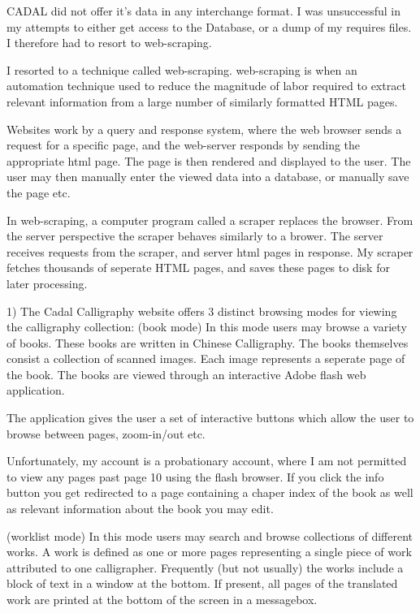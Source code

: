             CADAL did not offer it's data in any interchange format.  I was unsuccessful in my attempts to either get access to the Database, or a dump of my requires files.  I therefore had to resort to web-scraping.
            
              I resorted to a technique called web-scraping.  web-scraping is when an automation technique used to reduce the magnitude of labor required to extract relevant information from a large number of similarly formatted HTML pages.
    
    Websites work by a query and response system, where the web browser sends a request for a specific page, and the web-server responds by sending the appropriate html page.  The page is then rendered and displayed to the user.  The user may then manually enter the viewed data into a database, or manually save the page etc.
    
    In web-scraping, a computer program called a scraper replaces the browser.  From the server perspective the scraper behaves similarly to a brower.   The server receives requests from the scraper, and server html pages in response.  My scraper fetches thousands of seperate HTML pages, and saves these pages to disk for later processing.
    
    1)  The Cadal Calligraphy website offers 3 distinct browsing modes for viewing the calligraphy collection:
    (book mode)
        In this mode users may browse a variety of books.  These books are written in Chinese Calligraphy.  The books themselves consist a collection of scanned images.  Each image represents a seperate page of the book.  The books are viewed through an interactive Adobe flash web application.
        
        The application gives the user a set of interactive buttons which allow the user to browse between pages, zoom-in/out etc.  
        
        Unfortunately, my account is a probationary account, where I am not permitted to view any pages past page 10 using the flash browser.
        If you click the info button you get redirected to a page containing a chaper index of the book as well as relevant information about the book you may edit.

    (worklist mode)
        In this mode users may search and browse collections of different works.
            A work is defined as one or more pages representing a single piece of work attributed to one calligrapher.
            Frequently (but not usually) the works include a block of text in a window at the bottom.  If present, all pages of the translated work are printed at the bottom of the screen in a messagebox.
            
